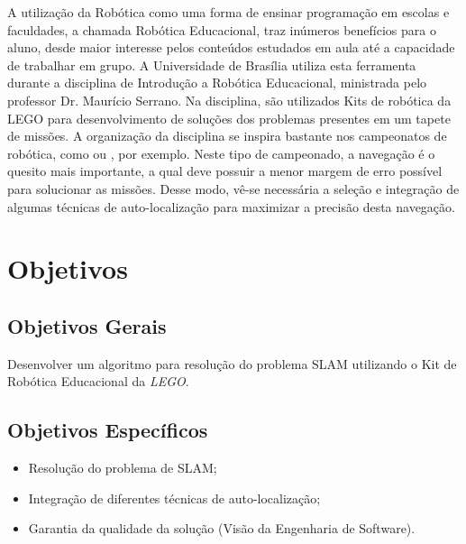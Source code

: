 	A utilização da Robótica como uma forma de ensinar programação em escolas e faculdades, a chamada Robótica Educacional, traz inúmeros benefícios para o aluno, desde maior interesse pelos conteúdos estudados em aula até a capacidade de trabalhar em grupo. A Universidade de Brasília utiliza esta ferramenta durante a disciplina de Introdução a Robótica Educacional, ministrada pelo professor Dr. Maurício Serrano. Na disciplina, são utilizados Kits de robótica da LEGO para desenvolvimento de soluções dos problemas presentes em um tapete de missões. A organização da disciplina se inspira bastante nos campeonatos de robótica, como \cite{ciber-rato} ou \cite{roboBulldozerIV}, por exemplo. Neste tipo de campeonado, a navegação é o quesito mais importante, a qual deve possuir a menor margem de erro possível para solucionar as missões. Desse modo, vê-se necessária a seleção e integração de algumas técnicas de auto-localização para maximizar a precisão desta navegação.
	




	\section{Objetivos}

	\subsection{Objetivos Gerais} %
	\label{sub:objetivos_gerais}
	
		Desenvolver um algoritmo para resolução do problema SLAM utilizando o Kit de Robótica Educacional da \textit{LEGO}.


	\subsection{Objetivos Específicos} %
	\label{sub:objetivos_específicos}

	\begin{itemize}
		\item Resolução do problema de SLAM;
		\item Integração de diferentes técnicas de auto-localização;
		\item Garantia da qualidade da solução (Visão da Engenharia de Software). 
	\end{itemize}
	
